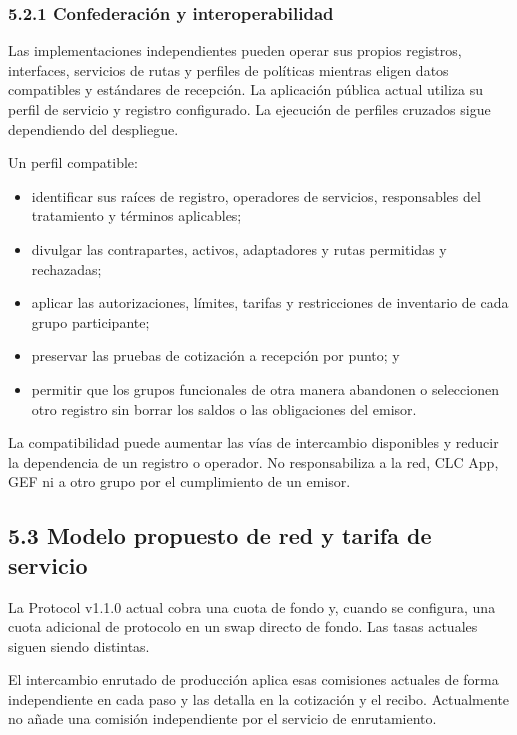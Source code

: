 \documentclass[11pt]{article}
\begin{document}
\subsubsection*{5.2.1 Confederación y interoperabilidad}

Las implementaciones independientes pueden operar sus propios registros, interfaces, servicios de rutas y perfiles de políticas mientras eligen datos compatibles y estándares de recepción. La aplicación pública actual utiliza su perfil de servicio y registro configurado. La ejecución de perfiles cruzados sigue dependiendo del despliegue.

Un perfil compatible:

\begin{itemize}[leftmargin=*]
\item identificar sus raíces de registro, operadores de servicios, responsables del tratamiento y términos aplicables;
\item divulgar las contrapartes, activos, adaptadores y rutas permitidas y rechazadas;
\item aplicar las autorizaciones, límites, tarifas y restricciones de inventario de cada grupo participante;
\item preservar las pruebas de cotización a recepción por punto; y
\item permitir que los grupos funcionales de otra manera abandonen o seleccionen otro registro sin borrar los saldos o las obligaciones del emisor.
\end{itemize}
La compatibilidad puede aumentar las vías de intercambio disponibles y reducir la dependencia de un registro o operador. No responsabiliza a la red, CLC App, GEF ni a otro grupo por el cumplimiento de un emisor.

\subsection*{5.3 Modelo propuesto de red y tarifa de servicio}

La Protocol v1.1.0 actual cobra una cuota de fondo y, cuando se configura, una cuota adicional de protocolo en un swap directo de fondo. Las tasas actuales siguen siendo distintas.

El intercambio enrutado de producción aplica esas comisiones actuales de forma independiente en cada paso y las detalla en la cotización y el recibo. Actualmente no añade una comisión independiente por el servicio de enrutamiento.
\end{document}
